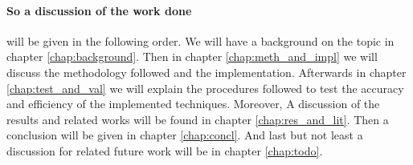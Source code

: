 	\paragraph{    So a discussion of the work done} will be given in the following order. We will have a background on the topic in chapter \ref{chap:background}. Then in chapter \ref{chap:meth_and_impl} we will discuss the methodology followed and the implementation. Afterwards in chapter \ref{chap:test_and_val} we will explain the procedures followed to test the accuracy and efficiency of the implemented techniques. Moreover, A discussion of the results and related works will be found in chapter \ref{chap:res_and_lit}. Then a conclusion will be given in chapter \ref{chap:concl}. And last but not least a discussion for related future work will be in chapter \ref{chap:todo}. 
